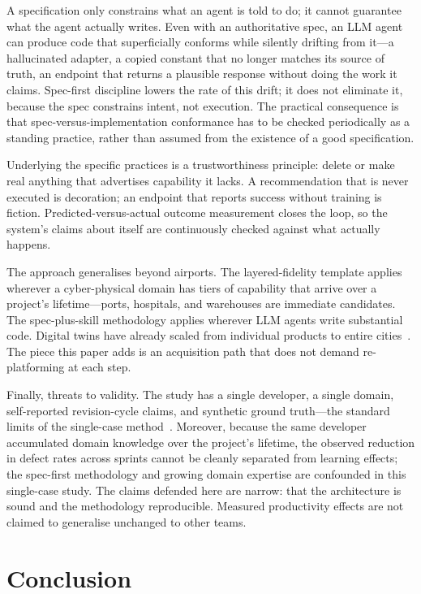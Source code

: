 \documentclass[runningheads]{llncs}
\begin{document}
A specification only constrains what an agent is told to do; it cannot guarantee what the agent actually writes. Even with an authoritative spec, an LLM agent can produce code that superficially conforms while silently drifting from it---a hallucinated adapter, a copied constant that no longer matches its source of truth, an endpoint that returns a plausible response without doing the work it claims. Spec-first discipline lowers the rate of this drift; it does not eliminate it, because the spec constrains intent, not execution. The practical consequence is that spec-versus-implementation conformance has to be checked periodically as a standing practice, rather than assumed from the existence of a good specification.

Underlying the specific practices is a trustworthiness principle: delete or make real anything that advertises capability it lacks. A recommendation that is never executed is decoration; an endpoint that reports success without training is fiction. Predicted-versus-actual outcome measurement closes the loop, so the system's claims about itself are continuously checked against what actually happens.

The approach generalises beyond airports. The layered-fidelity template applies wherever a cyber-physical domain has tiers of capability that arrive over a project's lifetime---ports, hospitals, and warehouses are immediate candidates. The spec-plus-skill methodology applies wherever LLM agents write substantial code. Digital twins have already scaled from individual products to entire cities~\cite{mohammadi2017}. The piece this paper adds is an acquisition path that does not demand re-platforming at each step.

Finally, threats to validity. The study has a single developer, a single domain, self-reported revision-cycle claims, and synthetic ground truth---the standard limits of the single-case method~\cite{runeson2009}. Moreover, because the same developer accumulated domain knowledge over the project's lifetime, the observed reduction in defect rates across sprints cannot be cleanly separated from learning effects; the spec-first methodology and growing domain expertise are confounded in this single-case study. The claims defended here are narrow: that the architecture is sound and the methodology reproducible. Measured productivity effects are not claimed to generalise unchanged to other teams.

\section{Conclusion}\label{sec:conclusion}
\end{document}
